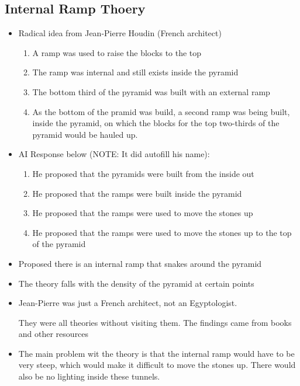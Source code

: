 \documentclass{article}
\begin{document}
\subsection{Internal Ramp Thoery}
\begin{itemize}
  \item Radical idea from Jean-Pierre Houdin (French architect)
    \begin{enumerate}
      \item A ramp was used to raise the blocks to the top
      \item The ramp was internal and still exists inside the pyramid
      \item The bottom third of the pyramid was built with an external ramp
      \item As the bottom of the pramid was build, a second ramp
        was being built, inside the pyramid, on which the blocks for the top two-thirds
        of the pyramid would be hauled up.
    \end{enumerate}
  \item AI Response below (NOTE: It did autofill his name):
    \begin{enumerate}
      \item He proposed that the pyramids were built from the inside out
      \item He proposed that the ramps were built inside the pyramid
      \item He proposed that the ramps were used to move the stones up
      \item He proposed that the ramps were used to move the stones up to the top of the pyramid
    \end{enumerate}
  \item Proposed there is an internal ramp that snakes around the pyramid
  \item The theory falls with the density of the pyramid at certain points
  \item Jean-Pierre was just a French architect, not an Egyptologist.

    They were all theories without visiting them. The findings came from
    books and other resources
  \item The main problem wit the theory is that the internal ramp would have to be
    very steep, which would make it difficult to move the stones up. There
    would also be no lighting inside these tunnels.
\end{itemize}
\end{document}
